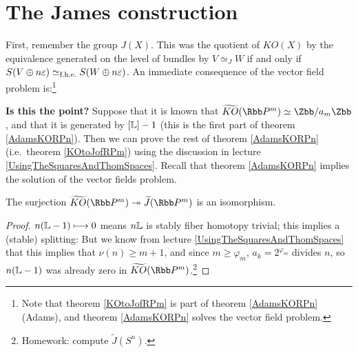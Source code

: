 


\section{The James construction} %
\label{TheJamesConstruction}
\ifx\OutputTheJamesConstruction\undefined\else
First, remember the group $J(X)$.  This was the quotient of $KO(X)$ by the equivalence generated on the level of bundles by $V \simeq_J W$ if and only if $S(V \oplus n \varepsilon) \simeq_\textup{f.h.e.} S(W \oplus n \varepsilon)$.  An immediate consequence of the vector field problem is:\footnote{Note that theorem \ref{KOtoJofRPm} is part of theorem \ref{AdamsKORPn} (Adams), and theorem \ref{AdamsKORPn} solves the vector field problem.}
\begin{ConfusedNote}
\textbf{Is this the point?}
Suppose that it is known that $\widetilde{KO}(\RP^m)\simeq\Zbb/a_m\Zbb$, and that it is generated by $[\mathbb{L}]-1$ (this is the first part of theorem \ref{AdamsKORPn}). Then we can prove the rest of theorem \ref{AdamsKORPn} (i.e.\ theorem \ref{KOtoJofRPm}) using the discussion in lecture \ref{UsingTheSquaresAndThomSpaces}. Recall that theorem \ref{AdamsKORPn} implies the solution of the vector fields problem.
\begin{thm} \label{KOtoJofRPm}
The surjection $\widetilde{KO}(\RP^m) \onto \widetilde J(\RP^m)$ is an isomorphism.
\end{thm}
\begin{proof}
$n(\mathbb{L} - 1) \longmapsto 0$ means $n \mathbb{L}$ is stably fiber homotopy trivial; this implies a (stable) splitting:
But we know from lecture \ref{UsingTheSquaresAndThomSpaces} that this implies that $\nu(n)\geq m+1$, and since $m\geq \varphi_m$, $a_k=2^{\varphi_m}$ divides $n$, so $n(\mathbb{L} - 1)$ was already zero in $\widetilde{KO}(\RP^m)$.\footnote{Homework: compute $\widetilde J(S^n)$.}
\end{proof}
\end{ConfusedNote}

